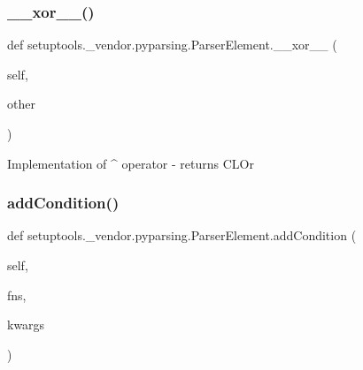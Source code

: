 \subsubsection{\texorpdfstring{\+\_\+\+\_\+xor\+\_\+\+\_\+()}{\_\_xor\_\_()}}
{\footnotesize\ttfamily def setuptools.\+\_\+vendor.\+pyparsing.\+Parser\+Element.\+\_\+\+\_\+xor\+\_\+\+\_\+ (\begin{DoxyParamCaption}\item[{}]{self,  }\item[{}]{other }\end{DoxyParamCaption})}

\begin{DoxyVerb}Implementation of ^ operator - returns C{L{Or}}
\end{DoxyVerb}
 \mbox{\label{classsetuptools_1_1__vendor_1_1pyparsing_1_1_parser_element_a6ade32202c2ff37b7466d8cf13efa000}} 
\subsubsection{\texorpdfstring{add\+Condition()}{addCondition()}}
{\footnotesize\ttfamily def setuptools.\+\_\+vendor.\+pyparsing.\+Parser\+Element.\+add\+Condition (\begin{DoxyParamCaption}\item[{}]{self,  }\item[{}]{fns,  }\item[{}]{kwargs }\end{DoxyParamCaption})}

